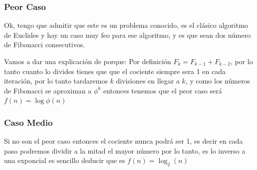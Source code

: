 \documentclass[12pt, fleqn]{article}                            %
\theoremstyle{break}                                            %
\begin{document}
        \subsubsection{Peor Caso}


            Ok, tengo que admitir que este es un problema conocido, es el clásico algoritmo de Euclides
            y hay un caso muy feo para ese algoritmo, y es que sean dos número de Fibonacci consecutivos.

            Vamos a dar una explicación de porque:
            Por definición $F_{k} = F_{k -1} + F_{k - 2}$, por lo tanto cuanto lo divides tienes que 
            que el cociente siempre sera 1 en cada iteración, por lo tanto tardaremos $k$ divisiones en 
            llegar a $k$, y como los números de Fibonacci se aproximan a $\phi^k$ entonces
            tenemos que el peor caso será $f(n) = \log{\phi}(n)$



        \subsubsection{Caso Medio}

            Si no son el peor caso entonces el cociente nunca podrá ser 1, es decir en cada paso podremos
            dividir a la mitad el mayor número por lo tanto, es lo inverso a una exponcial es sencillo deducir
            que es $f(n) = \log_2(n)$
\end{document}
